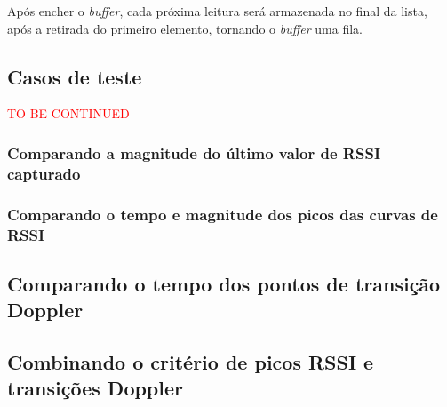  Após encher o \textit{buffer}, cada próxima leitura será armazenada no final da lista, após a retirada do primeiro elemento, tornando o \textit{buffer} uma fila.

 
 \subsection{Casos de teste}
 \textcolor{red}{TO BE CONTINUED} %
 
 \subsubsection{Comparando a magnitude do último valor de RSSI capturado}
 
 \subsubsection{Comparando o tempo e magnitude dos picos das curvas de RSSI}
 
 \subsection{Comparando o tempo dos pontos de transição Doppler}
 
 \subsection{Combinando o critério de picos RSSI e transições Doppler}


